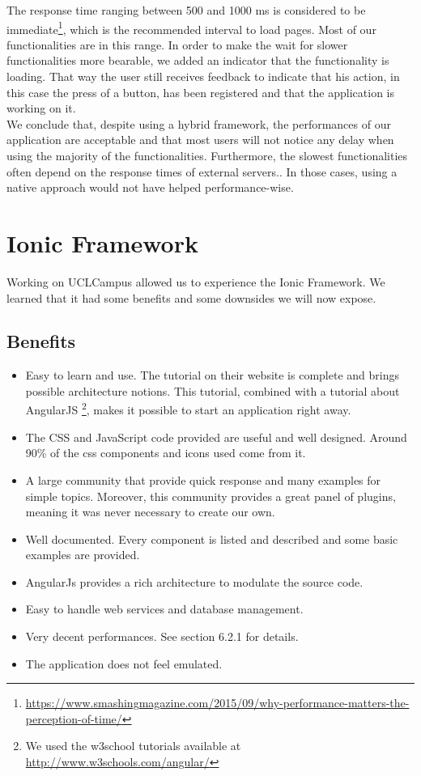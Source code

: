 \documentclass{eplmastersthesis}
\begin{document}
The response time ranging between 500 and 1000 ms is considered to be immediate\footnote{\url{https://www.smashingmagazine.com/2015/09/why-performance-matters-the-perception-of-time/}}, which is the recommended interval to load pages. Most of our functionalities are in this range. In order to make the wait for slower functionalities more bearable, we added an indicator that the functionality is loading. That way the user still receives feedback to indicate that his action, in this case the press of a button, has been registered and that the application is working on it. \\

We conclude that, despite using a hybrid framework, the performances of our application are acceptable and that most users will not notice any delay when using the majority of the functionalities. Furthermore, the slowest functionalities often depend on the response times of external servers.. In those cases, using a native approach would not have helped performance-wise. 

\section{Ionic Framework}
Working on UCLCampus allowed us to experience the Ionic Framework. We learned that it had some benefits and some downsides we will now expose.

\subsection{Benefits}
\begin{itemize}
\item Easy to learn and use. The tutorial on their website is complete and brings possible architecture notions. This tutorial, combined with a tutorial about AngularJS \footnote{We used the w3school tutorials available at \url{http://www.w3schools.com/angular/}}, makes it possible to start an application right away. 
\item The CSS and JavaScript code provided are useful and well designed. Around 90\% of the css components and icons used come from it.
\item A large community that provide quick response and many examples for simple topics. Moreover, this community provides a great panel of plugins, meaning it was never necessary to create our own. 
\item Well documented. Every component is listed and described and some basic examples are provided.
\item AngularJs provides a rich architecture to modulate the source code. 
\item Easy to handle web services and database management. 
\item Very decent performances. See section 6.2.1 for details.
\item The application does not feel emulated.
\end{itemize}
\end{document}
